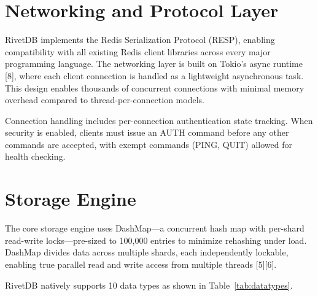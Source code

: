 \documentclass[12pt,a4paper]{report}
\begin{document}
\section{Networking and Protocol Layer}

RivetDB implements the Redis Serialization Protocol (RESP), enabling compatibility with all existing Redis client libraries across every major programming language. The networking layer is built on Tokio's async runtime [8], where each client connection is handled as a lightweight asynchronous task. This design enables thousands of concurrent connections with minimal memory overhead compared to thread-per-connection models.

Connection handling includes per-connection authentication state tracking. When security is enabled, clients must issue an AUTH command before any other commands are accepted, with exempt commands (PING, QUIT) allowed for health checking.

\section{Storage Engine}

The core storage engine uses DashMap---a concurrent hash map with per-shard read-write locks---pre-sized to 100,000 entries to minimize rehashing under load. DashMap divides data across multiple shards, each independently lockable, enabling true parallel read and write access from multiple threads [5][6].

RivetDB natively supports 10 data types as shown in Table~\ref{tab:datatypes}.
\end{document}
